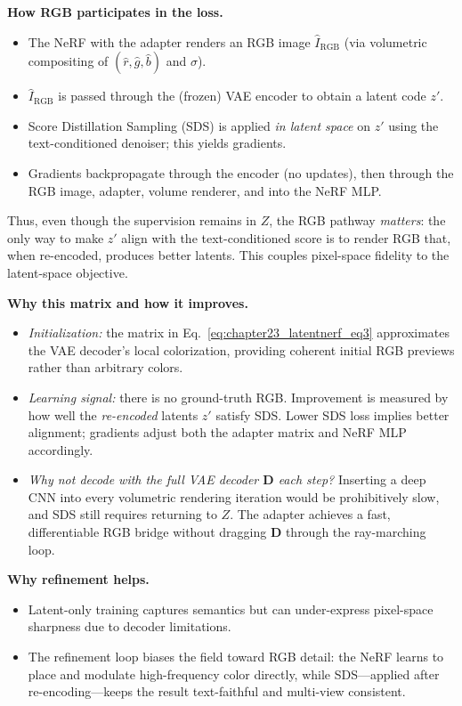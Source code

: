 \begin{enrichment}
\begin{enrichment}
        \textbf{How RGB participates in the loss.}
        \begin{itemize}
            \item The NeRF with the adapter renders an RGB image $\hat I_{\text{RGB}}$ (via volumetric compositing of $(\hat r,\hat g,\hat b)$ and $\sigma$).
            \item $\hat I_{\text{RGB}}$ is passed through the (frozen) VAE encoder to obtain a latent code $z'$.
            \item Score Distillation Sampling (SDS) is applied \emph{in latent space} on $z'$ using the text-conditioned denoiser; this yields gradients.
            \item Gradients backpropagate through the encoder (no updates), then through the RGB image, adapter, volume renderer, and into the NeRF MLP.  
        \end{itemize}
        Thus, even though the supervision remains in $Z$, the RGB pathway \emph{matters}: the only way to make $z'$ align with the text-conditioned score is to render RGB that, when re-encoded, produces better latents. This couples pixel-space fidelity to the latent-space objective.
        
        \textbf{Why this matrix and how it improves.}
        \begin{itemize}
            \item \emph{Initialization:} the matrix in Eq.~\ref{eq:chapter23_latentnerf_eq3} approximates the VAE decoder’s local colorization, providing coherent initial RGB previews rather than arbitrary colors.
            \item \emph{Learning signal:} there is no ground-truth RGB. Improvement is measured by how well the \emph{re-encoded} latents $z'$ satisfy SDS. Lower SDS loss implies better alignment; gradients adjust both the adapter matrix and NeRF MLP accordingly.
            \item \emph{Why not decode with the full VAE decoder $\mathbf{D}$ each step?} Inserting a deep CNN into every volumetric rendering iteration would be prohibitively slow, and SDS still requires returning to $Z$. The adapter achieves a fast, differentiable RGB bridge without dragging $\mathbf{D}$ through the ray-marching loop.
        \end{itemize}
        
        \textbf{Why refinement helps.}
        \begin{itemize}
            \item Latent-only training captures semantics but can under-express pixel-space sharpness due to decoder limitations.
            \item The refinement loop biases the field toward RGB detail: the NeRF learns to place and modulate high-frequency color directly, while SDS—applied after re-encoding—keeps the result text-faithful and multi-view consistent.
        \end{itemize}
        

\end{enrichment}
\end{enrichment}
